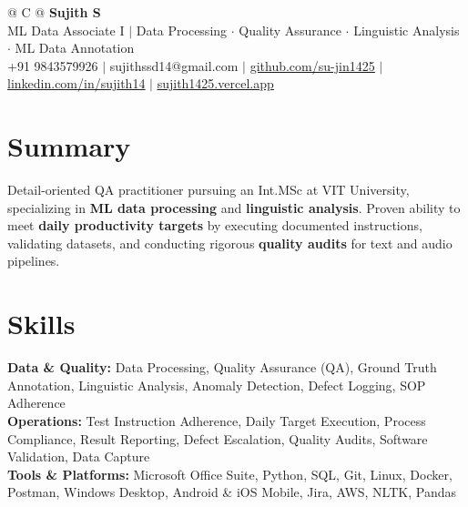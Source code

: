 \documentclass[a4paper,10pt]{article}
\newcommand{\ulink}[2]{\href{#1}{\uline{#2}}}
\begin{document}
\pagestyle{empty}

\begin{tabularx}{\linewidth}{@{} C @{}}
{\color[HTML]{000000}\fontsize{30}{35}\selectfont\bfseries Sujith S} \\[5pt]
{\fontsize{10.5}{12.5}\selectfont\color[HTML]{3A3A3A}
ML Data Associate I $|$ Data Processing $\cdot$ Quality Assurance $\cdot$ Linguistic Analysis $\cdot$ ML Data Annotation} \\[6pt]
{\fontsize{9.5}{11.5}\selectfont\textcolor[HTML]{3A3A3A}{+91 9843579926 $|$ sujithssd14@gmail.com $|$ \ulink{https://github.com/su-jin1425}{github.com/su-jin1425} $|$ \ulink{https://linkedin.com/in/sujith14}{linkedin.com/in/sujith14} $|$ \ulink{https://sujith1425.vercel.app}{sujith1425.vercel.app}}}
\end{tabularx}

\vspace{2pt}

\section{Summary}
\vspace{3pt}
{\color[HTML]{0A0A0A}\fontsize{11}{14}\selectfont
Detail-oriented QA practitioner pursuing an Int.MSc at VIT University, specializing in \textbf{ML data processing} and \textbf{linguistic analysis}. Proven ability to meet \textbf{daily productivity targets} by executing documented instructions, validating datasets, and conducting rigorous \textbf{quality audits} for text and audio pipelines.}

\vspace{2pt}

\section{Skills}
\vspace{3pt}
{\color[HTML]{0A0A0A}\fontsize{11}{14}\selectfont
\textbf{Data \& Quality:} Data Processing, Quality Assurance (QA), Ground Truth Annotation, Linguistic Analysis, Anomaly Detection, Defect Logging, SOP Adherence \\[2pt]
\textbf{Operations:} Test Instruction Adherence, Daily Target Execution, Process Compliance, Result Reporting, Defect Escalation, Quality Audits, Software Validation, Data Capture \\[2pt]
\textbf{Tools \& Platforms:} Microsoft Office Suite, Python, SQL, Git, Linux, Docker, Postman, Windows Desktop, Android \& iOS Mobile, Jira, AWS, NLTK, Pandas}
\end{document}
